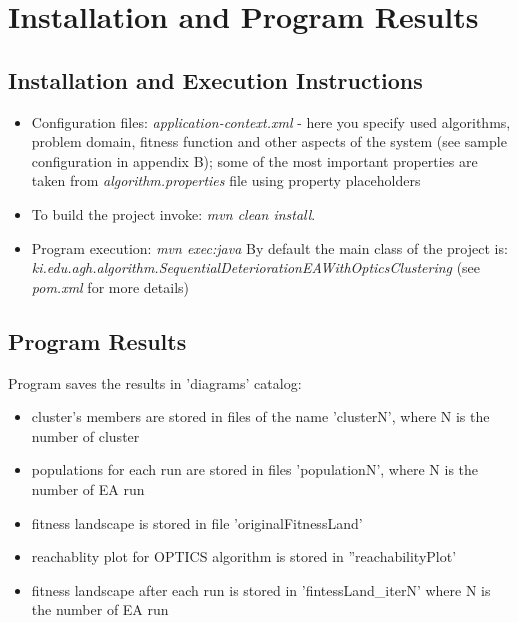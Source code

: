 \chapter{Installation and Program Results}
\label{Installation and Program Results}

\section{Installation and Execution Instructions}

\begin{itemize}
  \item Configuration files: \textit{application-context.xml} - here you
  specify used algorithms, problem domain, fitness function and other aspects
  of the system (see sample configuration in appendix B); some of the most
  important properties are taken from \textit{algorithm.properties} file
  using property placeholders 
  \item To build the project invoke: \textit{mvn clean install}. 
  \item Program execution: \textit{mvn exec:java} By default the main class of
  the project is:
  \textit{ki.edu.agh.algorithm.SequentialDeteriorationEAWithOpticsClustering}
  (see \textit{pom.xml} for more details)
\end{itemize}

\section{Program Results}
Program saves the results in 'diagrams' catalog:
\begin{itemize}
 \item cluster's members are stored in files of the name 'clusterN', where N is
 the number of cluster 
 \item populations for each run are stored in files
 'populationN', where N is the number of EA run 
 \item fitness landscape is stored in file 'originalFitnessLand'
 \item reachablity plot for OPTICS algorithm is stored in ''reachabilityPlot'
 \item fitness landscape after each run is stored in 'fintessLand\_iterN' where
 N is the number of EA run
\end{itemize}
